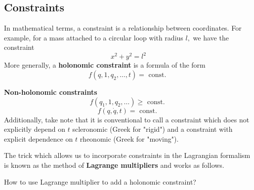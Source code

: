 \subsection{Constraints}
In mathematical terms, a constraint is a relationship between coordinates. For example, for a mass attached to a circular loop with radius $l,$ we have the constraint
$$
x^{2}+y^{2}=l^{2}
$$
More generally, a \textbf{holonomic constraint} is a formula of the form
$$
f\left(q, 1, q_{2}, \ldots, t\right)=\text { const. }
$$
\begin{qt}
\textbf{Non-holonomic constraints}
$$
f\left(q_{1}, 1, q_{2}, \ldots\right) \geq \text { const. }
$$
$$
f(q, \dot{q}, t)=\text { const. }
$$
Additionally, take note that it is conventional to call a constraint which does not explicitly depend on $t$ scleronomic (Greek for "rigid") and a constraint with explicit dependence on $t$ rheonomic (Greek for "moving").
\end{qt}
The trick which allows us to incorporate constraints in the Lagrangian formalism is known as the method of \textbf{Lagrange multipliers} and works as follows.
\begin{mybox}
\begin{center}
    How to use Lagrange multiplier to add a holonomic constraint?
\end{center}
\end{mybox}
